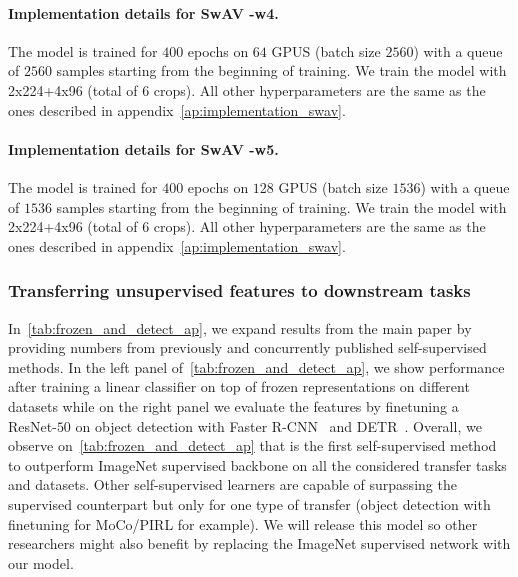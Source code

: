 \paragraph{Implementation details for SwAV \resnetfifty-w4.}
The model is trained for $400$ epochs on $64$ GPUS (batch size $2560$) with a queue of $2560$ samples starting from the beginning of training.
We train the model with 2x224+4x96 (total of $6$ crops).
All other hyperparameters are the same as the ones described in appendix~\ref{ap:implementation_swav}.

\paragraph{Implementation details for SwAV \resnetfifty-w5.}
The model is trained for $400$ epochs on $128$ GPUS (batch size $1536$) with a queue of $1536$ samples starting from the beginning of training.
We train the model with 2x224+4x96 (total of $6$ crops).
All other hyperparameters are the same as the ones described in appendix~\ref{ap:implementation_swav}.

\subsubsection{Transferring unsupervised features to downstream tasks}
In~\cref{tab:frozen_and_detect_ap}, we expand results from the main paper by providing numbers from previously and concurrently published self-supervised methods.
In the left panel of~\cref{tab:frozen_and_detect_ap}, we show performance after training a linear classifier on top of frozen representations on different datasets while on the right panel we evaluate the features by finetuning a ResNet-$50$ on object detection with Faster R-CNN~\cite{ren2015faster} and DETR~\cite{carion2020end}.
Overall, we observe on~\cref{tab:frozen_and_detect_ap} that \OURS is the first self-supervised method to outperform ImageNet supervised backbone on all the considered transfer tasks and datasets.
Other self-supervised learners are capable of surpassing the supervised counterpart but only for one type of transfer (object detection with finetuning for MoCo/PIRL for example).
We will release this model so other researchers might also benefit by replacing the ImageNet supervised network with our model.


